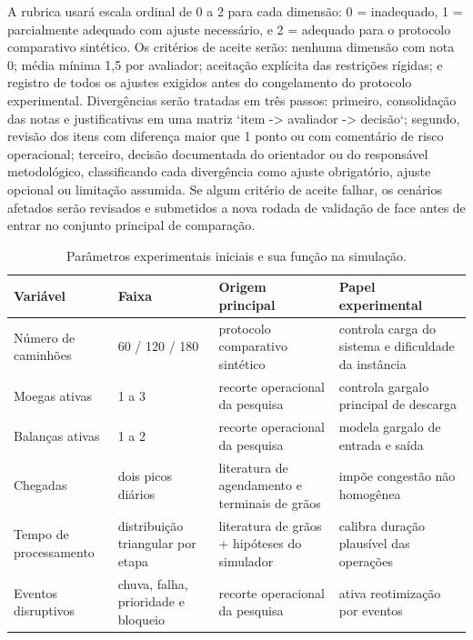 \documentclass[
  12pt,
  oneside,
  a4paper,
  sumario=tradicional,
  brazil
]{abntex2}
\begin{document}
A rubrica usar\'a escala ordinal de 0 a 2 para cada dimens\~ao: 0 = inadequado, 1 = parcialmente adequado com ajuste necess\'ario, e 2 = adequado para o protocolo comparativo sint\'etico. Os crit\'erios de aceite ser\~ao: nenhuma dimens\~ao com nota 0; m\'edia m\'inima 1,5 por avaliador; aceita\c{c}\~ao expl\'icita das restri\c{c}\~oes r\'igidas; e registro de todos os ajustes exigidos antes do congelamento do protocolo experimental. Diverg\^encias ser\~ao tratadas em tr\^es passos: primeiro, consolida\c{c}\~ao das notas e justificativas em uma matriz `item -> avaliador -> decis\~ao`; segundo, revis\~ao dos itens com diferen\c{c}a maior que 1 ponto ou com coment\'ario de risco operacional; terceiro, decis\~ao documentada do orientador ou do respons\'avel metodol\'ogico, classificando cada diverg\^encia como ajuste obrigat\'orio, ajuste opcional ou limita\c{c}\~ao assumida. Se algum crit\'erio de aceite falhar, os cen\'arios afetados ser\~ao revisados e submetidos a nova rodada de valida\c{c}\~ao de face antes de entrar no conjunto principal de compara\c{c}\~ao.

\begin{table}[H]
\centering
\small
\begin{tabular}{|p{}|p{}|p{}|p{}|}
\hline
\textbf{Vari\'avel} & \textbf{Faixa} & \textbf{Origem principal} & \textbf{Papel experimental} \\
\hline
N\'umero de caminh\~oes & 60 / 120 / 180 & protocolo comparativo sint\'etico & controla carga do sistema e dificuldade da inst\^ancia \\
\hline
Moegas ativas & 1 a 3 & recorte operacional da pesquisa & controla gargalo principal de descarga \\
\hline
Balan\c{c}as ativas & 1 a 2 & recorte operacional da pesquisa & modela gargalo de entrada e sa\'ida \\
\hline
Chegadas & dois picos di\'arios & literatura de agendamento e terminais de gr\~aos & imp\~oe congest\~ao n\~ao homog\^enea \\
\hline
Tempo de processamento & distribui\c{c}\~ao triangular por etapa & literatura de gr\~aos + hip\'oteses do simulador & calibra dura\c{c}\~ao plaus\'ivel das opera\c{c}\~oes \\
\hline
Eventos disruptivos & chuva, falha, prioridade e bloqueio & recorte operacional da pesquisa & ativa reotimiza\c{c}\~ao por eventos \\
\hline
\end{tabular}
\caption{Par\^ametros experimentais iniciais e sua fun\c{c}\~ao na simula\c{c}\~ao.}
\end{table}
\end{document}
